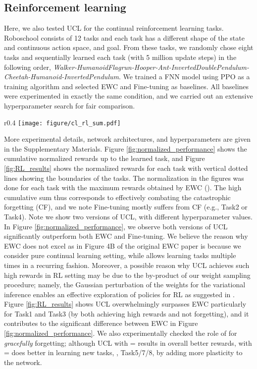\subsection{Reinforcement learning}
\vspace{-.05in}
Here, we also tested UCL for the continual reinforcement learning tasks. Roboschool \cite{(PPO)SchulmanWlskiKlimov} consists of 12 tasks and each task has a different shape of the state and continuous action space, and goal. From these tasks, we randomly chose eight tasks and sequentially learned each task (with 5 million update steps) in the following order,
\textit{Walker-HumanoidFlagrun-Hooper-Ant-InvertedDoublePendulum-Cheetah-Humanoid-InvertedPendulum}. We trained a FNN model using PPO \cite{(PPO)SchulmanWlskiKlimov} as a training algorithm and selected EWC and Fine-tuning as baselines. All baselines were experimented in exactly the same condition, and we carried out an extensive hyperparameter search for fair comparison. 
\begin{wrapfigure}{r}{0.4\textwidth} 
    \vspace{-.1in}
    \centering
    \texttt{[image: figure/cl\_rl\_sum.pdf]}
    \vspace{-.2in}
    \caption{Cumulative normalized rewards.}\label{fig:normalized_performance}
    \vspace{-.1in}
\end{wrapfigure}
More experimental details, network architectures, and hyperparameters are given in the Supplementary Materials. Figure \ref{fig:normalized_performance} shows the cumulative normalized rewards up to the learned task, and Figure \ref{fig:RL_results} shows the normalized rewards for each task with vertical dotted lines showing the boundaries of the tasks. The normalization in the figures was done for each task with the maximum rewards obtained by EWC (). The high cumulative sum thus corresponds to effectively combating the catastrophic forgetting (CF), and we note Fine-tuning mostly suffers from CF (e.g., Task2 or Task4). Note we show two versions of UCL, with different  hyperparameter values. 
In Figure \ref{fig:normalized_performance}, we observe both versions of UCL significantly outperform both EWC and Fine-tuning.
We believe the reason why EWC does not excel as in Figure 4B of the original EWC paper \cite{(EWC)KirkPascRabi17} is because we consider pure continual learning setting, while \cite{(EWC)KirkPascRabi17} allows learning tasks multiple times in a recurring fashion. Moreover, a possible reason why UCL achieves such high rewards in RL setting may be due to the by-product of our weight sampling procedure; namely, the Gaussian perturbation of the weights for the variational inference enables an effective exploration of policies for RL as suggested in \cite{(RLNoise)PlappertAndry18}. Figure \ref{fig:RL_results} shows UCL overwhelmingly surpasses EWC particularly for Task1 and Task3 (by both achieving high rewards and not forgetting), and it contributes to the significant difference between EWC in Figure \ref{fig:normalized_performance}. We also experimentally checked the role of  for \emph{gracefully} forgetting; although UCL with  =  results in overall better rewards, with  =  does better in learning new tasks, \eg, Task5/7/8, by adding more plasticity to the network. 
